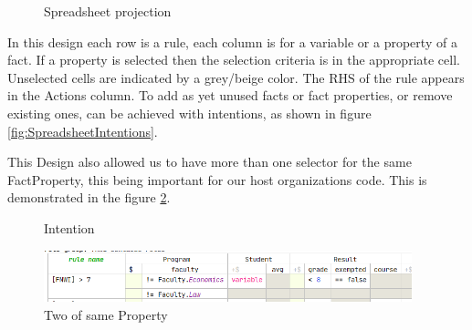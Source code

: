 \begin{figure}[h]
    \centering
    \caption{Spreadsheet projection}
    \label{fig:SpreadsheetProjection}
\end{figure}

In this design each row is a rule, each column is for a variable or a property of a fact.
If a property is selected then the selection criteria is in the appropriate cell.
Unselected cells are indicated by a grey/beige color.
The RHS of the rule appears in the Actions column.
To add as yet unused facts or fact properties, or remove existing ones, can be achieved with intentions, as shown in figure \ref{fig:SpreadsheetIntentions}.

This Design also allowed us to have more than one selector for the same FactProperty, this being important for our host organizations code.
This is demonstrated in the figure \ref{fig:TwoProperties}.

\begin{figure}
    \centering
    \begin{minipage}{0.35\textwidth}
        \centering
        \caption{Intention}
        \label{fig:SpreadsheetIntentions}
    \end{minipage}\hfill
    \begin{minipage}{0.65\textwidth}
        \centering
        \includegraphics[width=0.95\textwidth]{Sections/images/spreadsheetTwoProperties.png} 
        \caption{Two of same Property}
        \label{fig:TwoProperties}
    \end{minipage}
\end{figure}

